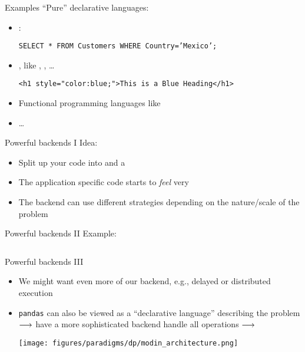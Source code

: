 \begin{frame}{Examples}
	\enquote{Pure} declarative languages:
	\begin{itemize}
		\item {} :
		\begin{center}
			\texttt{SELECT * FROM Customers WHERE Country='Mexico';}
		\end{center}
		\item {}, like ,  , \dots
		\begin{center}
			\texttt{<h1 style="color:blue;">This is a Blue Heading</h1>
			}
		\end{center}
		\item Functional programming languages like  
		\item \dots
\end{itemize}
\end{frame}
%
\begin{frame}{Powerful backends I}
	Idea:
	\begin{itemize}
		\item Split up your code into   and a  
		\item The application specific code starts to \emph{feel} very 
		\item The backend can use different strategies depending on the nature/scale of the problem
	\end{itemize}
\end{frame}
%
\begin{frame}{Powerful backends II}
	Example:
	\inputminted{python}{code/paradigms/dp/dataframes.py}
\end{frame}
%
%
\begin{frame}{Powerful backends III}
	\begin{itemize}
		\item We might want even more of our backend, e.g., delayed or distributed execution
		\item \texttt{pandas} can also be viewed as a \enquote{declarative language} describing the problem $\longrightarrow$ have a more sophisticated backend handle all operations $\longrightarrow$ 

		\texttt{[image: figures/paradigms/dp/modin\_architecture.png]}
	\end{itemize}
\end{frame}
